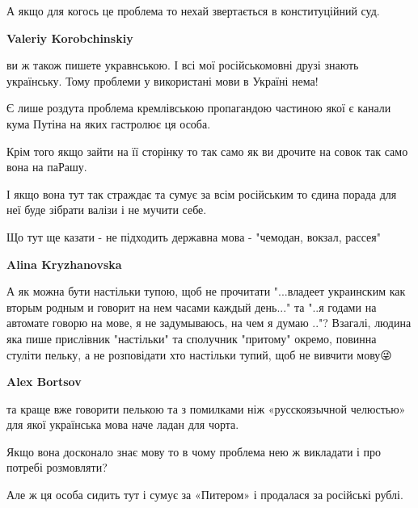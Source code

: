 \begin{itemize}
\begin{itemize}
А якщо для когось це проблема то нехай звертається в конституційний суд.


\textbf{Valeriy Korobchinskiy} 

ви ж також пишете укравнською. І всі мої російськомовні друзі знають
українську. Тому проблеми у використані мови в Україні нема!

Є лише роздута проблема кремлівською пропагандою частиною якої є канали кума
Путіна на яких гастролює ця особа.

Крім того якщо зайти на її сторінку то так само як ви дрочите на совок так само
вона на паРашу.

І якщо вона тут так страждає та сумує за всім російським то єдина порада для
неї буде зібрати валізи і не мучити себе.




Що тут ще казати - не підходить державна мова - "чемодан, вокзал, рассея"


\textbf{Alina Kryzhanovska} 

А як можна бути настільки тупою, щоб не прочитати
"...владеет украинским как вторым родным и говорит на нем часами каждый
день..." та "..я годами на автомате говорю на мове, я не задумываюсь, на чем я
думаю .."? Взагалі, людина яка пише прислівник "настільки" та сполучник
"притому" окремо, повинна стуліти пельку, а не розповідати хто настільки
тупий, щоб не вивчити мову😜


\textbf{Alex Bortsov} 

та краще вже говорити пелькою та з помилками ніж «русскоязычной челюстью» для
якої українська мова наче ладан для чорта.

Якщо вона досконало знає мову то в чому проблема нею ж викладати і про потребі
розмовляти?

Але ж ця особа сидить тут і сумує за «Питером» і продалася за російські рублі.



\end{itemize}
\end{itemize}
